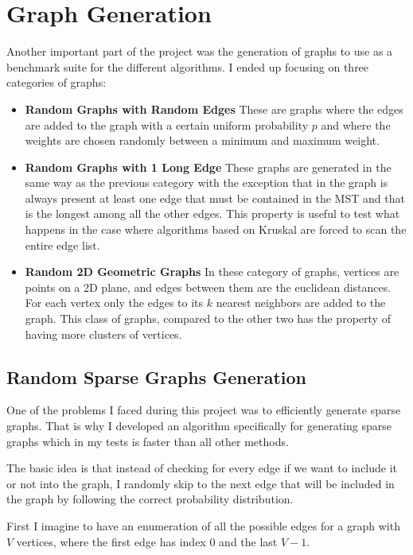 \documentclass{article}
\begin{document}
\section{Graph Generation}

Another important part of the project was the generation of graphs to use as a benchmark suite for the different algorithms. I ended up focusing on three categories of graphs:

\begin{itemize}
    \item \textbf{Random Graphs with Random Edges} These are graphs where the edges are added to the graph with a certain uniform probability $p$ and where the weights are chosen randomly between a minimum and maximum weight.
    \item \textbf{Random Graphs with 1 Long Edge} These graphs are generated in the same way as the previous category with the exception that in the graph is always present at least one edge that must be contained in the MST and that is the longest among all the other edges. This property is useful to test what happens in the case where algorithms based on Kruskal are forced to scan the entire edge list.
    \item \textbf{Random 2D Geometric Graphs} In these category of graphs, vertices are points on a 2D plane, and edges between them are the euclidean distances. For each vertex only the edges to its $k$ nearest neighbors are added to the graph. This class of graphs, compared to the other two has the property of having more clusters of vertices.
\end{itemize}

\subsection{Random Sparse Graphs Generation}

One of the problems I faced during this project was to efficiently generate sparse graphs. That is why I developed an algorithm specifically for generating sparse graphs which in my tests is faster than all other methods.

The basic idea is that instead of checking for every edge if we want to include it or not into the graph, I randomly skip to the next edge that will be included in the graph by following the correct probability distribution.

First I imagine to have an enumeration of all the possible edges for a graph with $V$ vertices, where the first edge has index $0$ and the last $V-1$.
\end{document}
